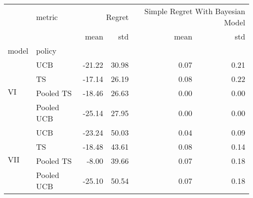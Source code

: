 \begin{tabular}{llrrrr}
\toprule
 & metric & \multicolumn{2}{r}{Regret} & \multicolumn{2}{r}{Simple Regret With Bayesian Model} \\
 &  & mean & std & mean & std \\
model & policy &  &  &  &  \\
\midrule
\multirow[c]{4}{*}{VI} & UCB & -21.22 & 30.98 & 0.07 & 0.21 \\
 & TS & -17.14 & 26.19 & 0.08 & 0.22 \\
 & Pooled TS & -18.46 & 26.63 & 0.00 & 0.00 \\
 & Pooled UCB & -25.14 & 27.95 & 0.00 & 0.00 \\
\multirow[c]{4}{*}{VII} & UCB & -23.24 & 50.03 & 0.04 & 0.09 \\
 & TS & -18.48 & 43.61 & 0.08 & 0.14 \\
 & Pooled TS & -8.00 & 39.66 & 0.07 & 0.18 \\
 & Pooled UCB & -25.10 & 50.54 & 0.07 & 0.18 \\
\bottomrule
\end{tabular}
